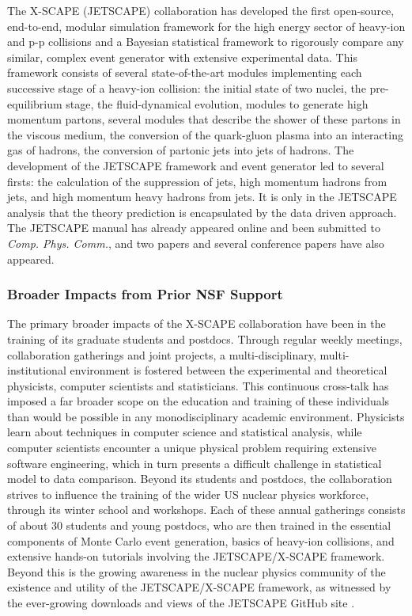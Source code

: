 \documentclass[11pt]{NSFamsart}
\begin{document}
The X-SCAPE (JETSCAPE) collaboration has developed the first open-source, end-to-end, modular simulation framework for the high energy sector of heavy-ion and p-p collisions and a Bayesian statistical framework to rigorously compare any similar, complex event generator with extensive experimental data. This framework consists of several state-of-the-art modules implementing each successive stage of a heavy-ion collision: the initial state of two nuclei, the pre-equilibrium stage, the fluid-dynamical evolution, modules to generate high momentum partons, several modules that describe the shower of these partons in the viscous medium, the conversion of
the quark-gluon plasma into an interacting gas of hadrons, the conversion of partonic jets into jets of hadrons. The development of the JETSCAPE framework and event generator led to several firsts: the calculation of the suppression of jets, high momentum hadrons from jets, and high momentum heavy hadrons from jets. It is only in the JETSCAPE analysis that the theory prediction is encapsulated by the data driven approach. The JETSCAPE manual has already appeared online \cite{putschke2019jetscape} and been submitted to \textit{Comp. Phys. Comm.}, and two papers \cite{cao2017multistage,kumar2019jetscape} and several conference papers \cite{soltz2018bayesian,tachibana2018jet,kauder2019jetscape,park2019multi} have also appeared.

\subsubsection{Broader Impacts from Prior NSF Support}
The primary broader impacts of the X-SCAPE collaboration have been in the training of its graduate students and postdocs. Through regular weekly meetings, collaboration gatherings and joint projects, a multi-disciplinary, multi-institutional environment is fostered between the experimental and theoretical physicists, computer scientists and statisticians. This continuous cross-talk has imposed a far broader scope on the education and training of these individuals than would be possible in any monodisciplinary academic environment. Physicists learn about techniques in computer science and statistical analysis, while computer scientists encounter a unique physical problem requiring extensive software engineering, which in turn presents a difficult challenge in statistical model to data comparison. Beyond its students and postdocs, the collaboration strives to influence the training of the wider US nuclear physics workforce, through its winter school and workshops. Each of these annual gatherings consists of about 30 students and young postdocs, who are then trained in the essential components of Monte Carlo event generation, basics of heavy-ion collisions, and extensive hands-on tutorials involving the JETSCAPE/X-SCAPE framework. Beyond this is the growing awareness in the nuclear physics community of the existence and utility of the JETSCAPE/X-SCAPE framework, as witnessed by the ever-growing downloads and views of the JETSCAPE GitHub site \cite{jetscape}.
\end{document}
